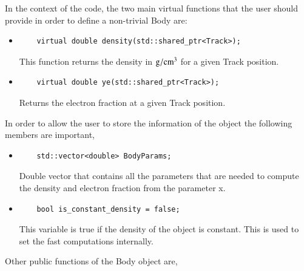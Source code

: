 \documentclass[3p,12pt]{elsarticle}
\newcommand{\ttf}{\ttfamily}
\begin{document}
In the context of the code, the two main virtual functions that the
user should provide in order to define a non-trivial {\ttf Body} are:
\begin{itemize}
\item 
  \begin{lstlisting}
    virtual double density(std::shared_ptr<Track>);
  \end{lstlisting}
This function returns the density in ${\rm g}/{\rm cm}^3$ for a
given {\ttf Track} position.
\item 
  \begin{lstlisting}
    virtual double ye(std::shared_ptr<Track>);
  \end{lstlisting}
Returns the electron fraction at a given {\ttf Track} position.
\end{itemize}

In order to allow the user to store the information of the
object the following members are important,

\begin{itemize}
\item  
  \begin{lstlisting}
    std::vector<double> BodyParams;
  \end{lstlisting}
  Double vector that contains all the parameters that are
  needed to compute the density and electron fraction from the parameter
  {\ttf x}.
  
\item  
  \begin{lstlisting}
    bool is_constant_density = false;
  \end{lstlisting}  
  This variable is {\ttf true} if the density of the object is constant. This is
  used to set the fast computations internally.
\end{itemize}

Other public functions of the {\ttf Body} object are,
\end{document}
